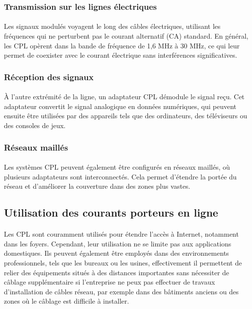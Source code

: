 \documentclass[a4paper,twocolumn]{report}
\begin{document}
\subsubsection{Transmission sur les lignes électriques}
\paragraph{} Les signaux modulés voyagent le long des câbles électriques,
utilisant les fréquences qui ne perturbent pas le courant alternatif (CA) standard.
En général, les CPL opèrent dans la bande de fréquence de 1,6 MHz à 30 MHz,
ce qui leur permet de coexister avec le courant électrique sans interférences significatives.

\subsubsection{Réception des signaux}
\paragraph{} À l'autre extrémité de la ligne, un adaptateur CPL démodule le signal reçu.
Cet adaptateur convertit le signal analogique en données numériques,
qui peuvent ensuite être utilisées par des appareils tels que des ordinateurs,
des téléviseurs ou des consoles de jeux.

\subsubsection{Réseaux maillés}
\paragraph{} Les systèmes CPL peuvent également être configurés en réseaux maillés,
où plusieurs adaptateurs sont interconnectés. Cela permet d'étendre la portée du réseau
et d'améliorer la couverture dans des zones plus vastes.

\subsection{Utilisation des courants porteurs en ligne}
\paragraph{} Les CPL sont couramment utilisés pour étendre l'accès à Internet, notamment dans les foyers. Cependant, leur utilisation ne se limite pas aux applications domestiques. Ils peuvent également être employés dans des environnements professionnels, tels que les bureaux ou les usines, effectivement il permettent de relier des équipements situés à des distances importantes sans nécessiter de câblage supplémentaire si l'entreprise ne peux pas effectuer de travaux d'installation de câbles réseau, par exemple dans des bâtiments anciens ou des zones où le câblage est difficile à installer.
\end{document}
